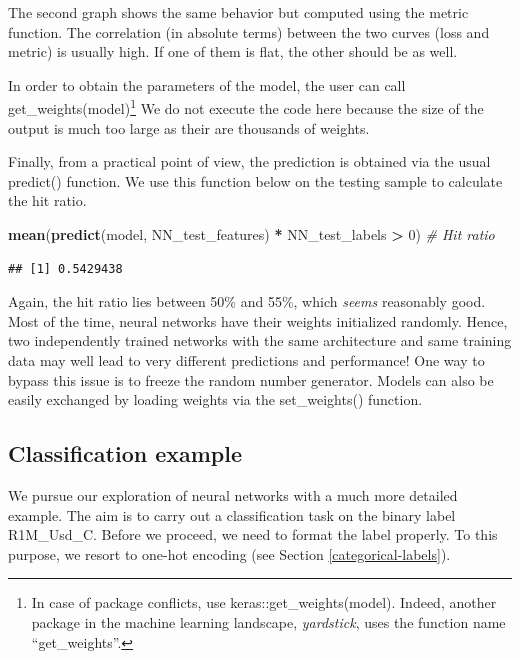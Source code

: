 \documentclass[]{krantz}
\makeatletter
\newenvironment{Shaded}{\begin{snugshade}}{\end{snugshade}}
\newcommand{\CommentTok}[1]{\textcolor[rgb]{0.37,0.37,0.37}{\textit{#1}}}
\newcommand{\DecValTok}[1]{\textcolor[rgb]{0.06,0.06,0.06}{#1}}
\newcommand{\KeywordTok}[1]{\textcolor[rgb]{0.27,0.27,0.27}{\textbf{#1}}}
\newcommand{\NormalTok}[1]{#1}
\newcommand{\OperatorTok}[1]{\textcolor[rgb]{0.43,0.43,0.43}{\textbf{#1}}}
\newcommand{\StringTok}[1]{\textcolor[rgb]{0.5,0.5,0.5}{#1}}
\newenvironment{kframe}{%
\medskip{}
\setlength{\fboxsep}{.8em}
 \def\at@end@of@kframe{}%
 \ifinner\ifhmode%
  \def\at@end@of@kframe{\end{minipage}}%
  \begin{minipage}{\columnwidth}%
 \fi\fi%
 \def\FrameCommand##1{\hskip\@totalleftmargin \hskip-\fboxsep
 \colorbox{shadecolor}{##1}\hskip-\fboxsep
     \hskip-\linewidth \hskip-\@totalleftmargin \hskip\columnwidth}%
 \MakeFramed {\advance\hsize-\width
   \@totalleftmargin\z@ \linewidth\hsize
   \@setminipage}}%
 {\par\unskip\endMakeFramed%
 \at@end@of@kframe}
\renewenvironment{Shaded}{\begin{kframe}}{\end{kframe}}
\let\rmarkdownfootnote\footnote%
\def\footnote{\protect\rmarkdownfootnote}
\theoremstyle{definition}
\theoremstyle{definition}
\theoremstyle{definition}
\theoremstyle{remark}
\makeatother
\begin{document}
The second graph shows the same behavior but computed using the metric
function. The correlation (in absolute terms) between the two curves
(loss and metric) is usually high. If one of them is flat, the other
should be as well.

In order to obtain the parameters of the model, the user can call
get\_weights(model)\footnote{In case of package conflicts, use
  keras::get\_weights(model). Indeed, another package in the machine
  learning landscape, \emph{yardstick}, uses the function name
  ``get\_weights''.} We do not execute the code here because the size of
the output is much too large as their are thousands of weights.

Finally, from a practical point of view, the prediction is obtained via
the usual predict() function. We use this function below on the testing
sample to calculate the hit ratio.

\footnotesize

\begin{Shaded}
\begin{Highlighting}[]
\KeywordTok{mean}\NormalTok{(}\KeywordTok{predict}\NormalTok{(model, NN_test_features) }\OperatorTok{*}\StringTok{ }\NormalTok{NN_test_labels }\OperatorTok{>}\StringTok{ }\DecValTok{0}\NormalTok{) }\CommentTok{# Hit ratio}
\end{Highlighting}
\end{Shaded}

\begin{verbatim}
## [1] 0.5429438
\end{verbatim}

\normalsize

Again, the hit ratio lies between 50\% and 55\%, which \emph{seems}
reasonably good. Most of the time, neural networks have their weights
initialized randomly. Hence, two independently trained networks with the
same architecture and same training data may well lead to very different
predictions and performance! One way to bypass this issue is to freeze
the random number generator. Models can also be easily exchanged by
loading weights via the set\_weights() function.

\hypertarget{classification-example}{%
\subsection{Classification example}\label{classification-example}}

We pursue our exploration of neural networks with a much more detailed
example. The aim is to carry out a classification task on the binary
label R1M\_Usd\_C. Before we proceed, we need to format the label
properly. To this purpose, we resort to one-hot encoding (see Section
\ref{categorical-labels}).
\end{document}
